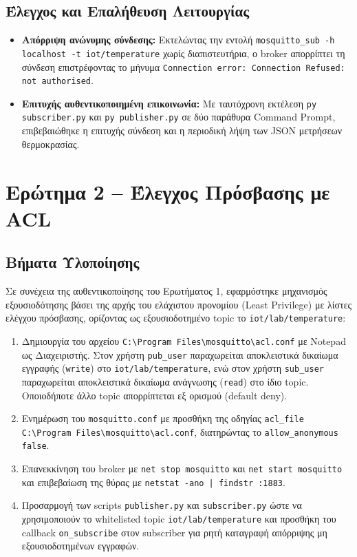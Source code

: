 \documentclass[11pt, a4paper]{article}
\begin{document}
\subsection{Έλεγχος και Επαλήθευση Λειτουργίας}
\begin{itemize}
    \item \textbf{Απόρριψη ανώνυμης σύνδεσης:} Εκτελώντας την εντολή \texttt{mosquitto\_sub -h localhost -t iot/temperature} χωρίς διαπιστευτήρια, ο broker απορρίπτει τη σύνδεση επιστρέφοντας το μήνυμα \texttt{Connection error: Connection Refused: not authorised}.
    \item \textbf{Επιτυχής αυθεντικοποιημένη επικοινωνία:} Με ταυτόχρονη εκτέλεση \texttt{py subscriber.py} και \texttt{py publisher.py} σε δύο παράθυρα Command Prompt, επιβεβαιώθηκε η επιτυχής σύνδεση και η περιοδική λήψη των JSON μετρήσεων θερμοκρασίας.
\end{itemize}

\section{Ερώτημα 2 -- Έλεγχος Πρόσβασης με ACL}

\subsection{Βήματα Υλοποίησης}
Σε συνέχεια της αυθεντικοποίησης του Ερωτήματος 1, εφαρμόστηκε μηχανισμός εξουσιοδότησης βάσει της αρχής του ελάχιστου προνομίου (Least Privilege) με λίστες ελέγχου πρόσβασης, ορίζοντας ως εξουσιοδοτημένο topic το \texttt{iot/lab/temperature}:

\begin{enumerate}
    \item Δημιουργία του αρχείου \texttt{C:\textbackslash{}Program Files\textbackslash{}mosquitto\textbackslash{}acl.conf} με Notepad ως Διαχειριστής. Στον χρήστη \texttt{pub\_user} παραχωρείται αποκλειστικά δικαίωμα εγγραφής (\texttt{write}) στο \texttt{iot/lab/temperature}, ενώ στον χρήστη \texttt{sub\_user} παραχωρείται αποκλειστικά δικαίωμα ανάγνωσης (\texttt{read}) στο ίδιο topic. Οποιοδήποτε άλλο topic απορρίπτεται εξ ορισμού (default deny).
    \item Ενημέρωση του \texttt{mosquitto.conf} με προσθήκη της οδηγίας \texttt{acl\_file \\ C:\textbackslash{}Program Files\textbackslash{}mosquitto\textbackslash{}acl.conf}, διατηρώντας το \texttt{allow\_anonymous false}.
    \item Επανεκκίνηση του broker με \texttt{net stop mosquitto} και \texttt{net start mosquitto} και επιβεβαίωση της θύρας με \texttt{netstat -ano | findstr :1883}.
    \item Προσαρμογή των scripts \texttt{publisher.py} και \texttt{subscriber.py} ώστε να χρησιμοποιούν το whitelisted topic \texttt{iot/lab/temperature} και προσθήκη του callback \texttt{on\_subscribe} στον subscriber για ρητή καταγραφή απόρριψης μη εξουσιοδοτημένων εγγραφών.
\end{enumerate}
\end{document}

